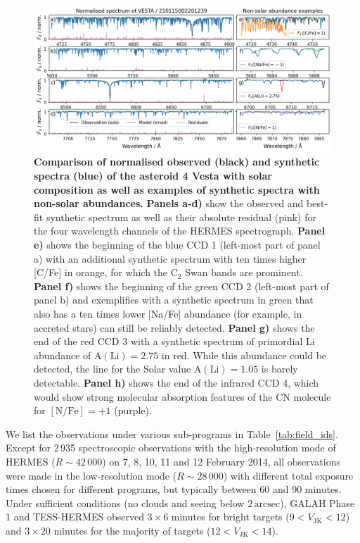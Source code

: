 \documentclass[
  journal=pasa,
  manuscript=research-paper, %
  year=2024,
  volume=37
]{cup-journal}
\begin{document}
\begin{figure}[ht]
 \centering
 \includegraphics[width=\textwidth]{figures/210115002201239_abundance_examples.png}
 \caption{\textbf{Comparison of normalised observed (black) and synthetic spectra (blue) of the asteroid 4 Vesta with solar composition as well as examples of synthetic spectra with non-solar abundances.}
 \textbf{Panels a-d)} show the observed and best-fit synthetic spectrum as well as their absolute residual (pink) for the four wavelength channels of the HERMES spectrograph.
 \textbf{Panel e)} shows the beginning of the blue CCD 1 (left-most part of panel a) with an additional synthetic spectrum with ten times higher [C/Fe] in orange, for which the $\mathrm{C}_2$  Swan bands are prominent.
 \textbf{Panel f)} shows the beginning of the green CCD 2 (left-most part of panel b) and exemplifies with a synthetic spectrum in green that also has a ten times lower [Na/Fe] abundance (for example, in accreted stars) can still be reliably detected. 
 \textbf{Panel g)} shows the end of the red CCD 3 with a synthetic spectrum of primordial Li abundance of $\mathrm{A(Li)} = 2.75$ in red. While this abundance could be detected, the line for the Solar value $\mathrm{A(Li)} = 1.05$ is barely detectable.
 \textbf{Panel h)} shows the end of the infrared CCD 4, which would show strong molecular absorption features of the CN molecule for $\mathrm{[N/Fe]} = +1$ (purple).
 }
 \label{fig:210115002201239_abundance_examples}
\end{figure}

We list the observations under various sub-programs in Table~\ref{tab:field_ids}. Except for 2\,935 spectroscopic observations with the high-resolution mode of HERMES ($R \sim 42\,000$) on 7, 8, 10, 11 and 12 February 2014, all observations were made in the low-resolution mode ($R \sim 28\,000$) with different total exposure times chosen for different programs, but typically between 60 and 90 minutes. Under sufficient conditions (no clouds and seeing below $2\,\mathrm{arcsec}$), GALAH Phase 1 and TESS-HERMES observed $3 \times 6$ minutes for bright targets ($9 < V_\mathrm{JK} < 12$) and $3 \times 20$ minutes for the majority of targets ($12 < V_\mathrm{JK} < 14$).
\end{document}
